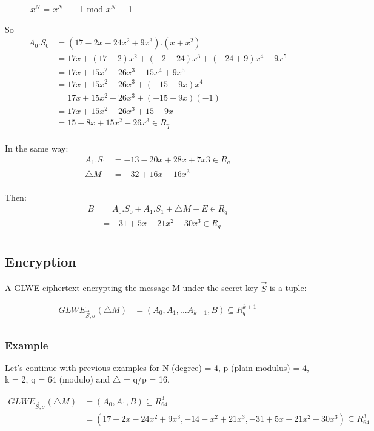 \documentclass{techrep}
\theoremstyle{definition}
\theoremstyle{plain}
\begin{document}
        $\quad \quad \quad  x^N$  = $x^N \equiv$ -1 mod $x^N$ + 1

So
	\begin{align*}
		 A_0.S_0 &=  (17-2x -24x^2 +9x^3).(x + x^2) \\
            &= 17x + (17-2)x^2 + (-2-24)x^3 + (-24+9)x^4 + 9x^5  \\
            &= 17x + 15x^2 -26x^3 - 15x^4 + 9x^5  \\
            &= 17x + 15x^2 -26x^3 + (-15 + 9x)x^4  \\
            &= 17x + 15x^2 -26x^3 + (-15 + 9x)(-1)  \\
            &= 17x + 15x^2 -26x^3 + 15  -9x  \\
            &= 15 + 8x + 15x^2 -26x^3  \in R_q \\
	\end{align*}

In the same way:
	\begin{align*}
		 A_1.S_1 &=  -13-20x+28x+7x3 \in R_q \\
         \bigtriangleup M &= -32 +16x - 16x^3  \\
	\end{align*}

Then:
	\begin{align*}
		 B &=   A_0.S_0 + A_1.S_1 + \bigtriangleup M + E \in R_q  \\
          &= -31 + 5x - 21x^2 + 30x^3 \in R_q  \\
	\end{align*}


	\subsection{Encryption}
A GLWE ciphertext encrypting the message M under the secret key $\overrightarrow{S}$ is a tuple:

	\begin{align*}
GLWE_{\overrightarrow{S},\sigma}(\bigtriangleup M)	&=	 (A_0,A_1,...A_{k-1}, B) \subseteq  R_{q}^{k+1} \\
	\end{align*}

\subsubsection{Example}
Let’s continue with previous examples for N (degree) = 4, p (plain modulus) = 4, k = 2, q = 64 (modulo) and $\bigtriangleup$ = q/p = 16.


	\begin{align*}
        GLWE_{\overrightarrow{S},\sigma}(\bigtriangleup M)	&=	 (A_0,A_{1}, B) \subseteq  R_{64}^{3} \\
        &= (17-2x -24x^2 +9x^3, -14-x^2+21x^3, -31 + 5x - 21x^2 + 30x^3) \subseteq  R_{64}^{3} 
	\end{align*}
\end{document}
